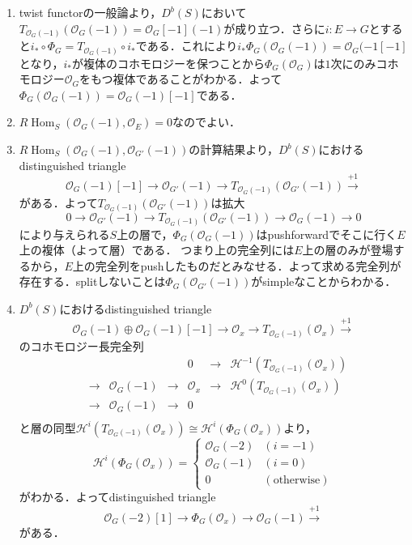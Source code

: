 \documentclass[uplatex,a4paper,11pt,dvipdfmx]{jsarticle}
\makeatletter
\theoremstyle{mystyle} %
\renewenvironment{proof}[1][\proofname]{\par
 \pushQED{\qed}%
 \normalfont \topsep6\p@\@plus6\p@\relax
 \trivlist
 \item[\hskip\labelsep
 \itshape
 {\bf\underline{#1}}]\ignorespaces
}{%
 \popQED\endtrivlist\@endpefalse
}
\DeclareMathOperator{\Hom}{Hom}
\makeatother
\begin{document}
\begin{proof}
	\begin{enumerate}
		\item twist functorの一般論より，$D^b(S)$において$T_{\mathcal{O}_G(-1)}(\mathcal{O}_G(-1)) = \mathcal{O}_G[-1](-1)$が成り立つ．さらに$i \colon E \to G$とすると$i_*\circ \Phi_G = T_{\mathcal{O}_G(-1)}\circ i_*$である．これにより$i_*\Phi_G(\mathcal{O}_G(-1)) = \mathcal{O}_G(-1[-1]$となり，$i_*$が複体のコホモロジーを保つことから$\Phi_G(\mathcal{O}_G)$は$1$次にのみコホモロジー$\mathcal{O}_G$をもつ複体であることがわかる．よって$\Phi_G(\mathcal{O}_G(-1)) = \mathcal{O}_G(-1)[-1]$である．
		\item $R\Hom_S(\mathcal{O}_G(-1), \mathcal{O}_E)=0$なのでよい．
		\item $R\Hom_S(\mathcal{O}_G(-1), \mathcal{O}_{G'}(-1))$の計算結果より，$D^b(S)$におけるdistinguished triangle
		      $$ \mathcal{O}_G(-1)[-1] \to \mathcal{O}_{G'}(-1) \to T_{\mathcal{O}_G(-1)}(\mathcal{O}_{G'}(-1))\xrightarrow{+1}$$
		      がある．よって$T_{\mathcal{O}_G(-1)}(\mathcal{O}_{G'}(-1))$は拡大$$0 \to \mathcal{O}_{G'}(-1) \to T_{\mathcal{O}_G(-1)}(\mathcal{O}_{G'}(-1)) \to \mathcal{O}_G(-1) \to 0$$により与えられる$S$上の層で，$\Phi_G(\mathcal{O}_G(-1))$はpushforwardでそこに行く$E$上の複体（よって層）である．
		      つまり上の完全列には$E$上の層のみが登場するから，$E$上の完全列をpushしたものだとみなせる．よって求める完全列が存在する．splitしないことは$\Phi_G(\mathcal{O}_{G'}(-1))$がsimpleなことからわかる．
		\item$D^b(S)$におけるdistinguished triangle
		      $$ \mathcal{O}_G(-1) \oplus \mathcal{O}_G(-1)[-1] \to \mathcal{O}_x \to T_{\mathcal{O}_G(-1)}(\mathcal{O}_x)\xrightarrow{+1}$$のコホモロジー長完全列
		      \[
			      \begin{array}{ccccccc}
				       &     &                   &     & 0             & \to & \mathcal{H}^{-1}(T_{\mathcal{O}_G(-1)}(\mathcal{O}_x)) \\

				       & \to & \mathcal{O}_G(-1) & \to & \mathcal{O}_x & \to & \mathcal{H}^0(T_{\mathcal{O}_G(-1)}(\mathcal{O}_x))    \\
				       & \to & \mathcal{O}_G(-1) & \to & 0             &     &                                                        \\
			      \end{array}
		      \]
		      と層の同型$\mathcal{H}^i(T_{\mathcal{O}_G(-1)}(\mathcal{O}_x)) \cong \mathcal{H}^i(\Phi_G(\mathcal{O}_x))$より，$$\mathcal{H}^i(\Phi_G(\mathcal{O}_x)) = \left \{
			      \begin{array}{ll}
				      \mathcal{O}_G(-2) & (i=-1)             \\
				      \mathcal{O}_G(-1) & (i=0)              \\
				      0                 & (\text{otherwise})
			      \end{array}
			      \right.$$
		      がわかる．よってdistinguished triangle
		      $$\mathcal{O}_G(-2)[1]\to \Phi_G(\mathcal{O}_x)\to \mathcal{O}_G(-1) \xrightarrow{+1} $$がある．
	\end{enumerate}
\end{proof}
\end{document}
